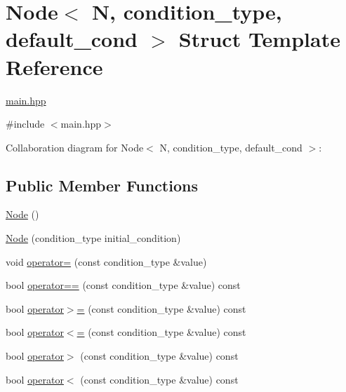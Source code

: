 \hypertarget{struct_node}{}\section{Node$<$ N, condition\+\_\+type, default\+\_\+cond $>$ Struct Template Reference}
\label{struct_node}


\hyperlink{main_8hpp}{main.\+hpp}  




{\ttfamily \#include $<$main.\+hpp$>$}



Collaboration diagram for Node$<$ N, condition\+\_\+type, default\+\_\+cond $>$\+:
\subsection*{Public Member Functions}
\begin{DoxyCompactItemize}
\item 
\hyperlink{struct_node_a4ada28a6ae351e0507feeb065818bc31}{Node} ()
\item 
\hyperlink{struct_node_a734cbfa12fda2238fe488eceaae1963a}{Node} (condition\+\_\+type initial\+\_\+condition)
\item 
void \hyperlink{struct_node_a1fd39050dc2575b78fdfe894c006c6af}{operator=} (const condition\+\_\+type \&value)
\item 
bool \hyperlink{struct_node_a971919f93889cf8d00a6e28bd4fe947e}{operator==} (const condition\+\_\+type \&value) const
\item 
bool \hyperlink{struct_node_a6ffc542cb938c021de9086e34c65b890}{operator$>$=} (const condition\+\_\+type \&value) const
\item 
bool \hyperlink{struct_node_a1d153da28c06489540efb6cc7117eb6d}{operator$<$=} (const condition\+\_\+type \&value) const
\item 
bool \hyperlink{struct_node_a8a002b9ad673ecc9715803e374481018}{operator$>$} (const condition\+\_\+type \&value) const
\item 
bool \hyperlink{struct_node_a9a8c2549e36079adb11fa1aafe9c6cc0}{operator$<$} (const condition\+\_\+type \&value) const
\end{DoxyCompactItemize}
